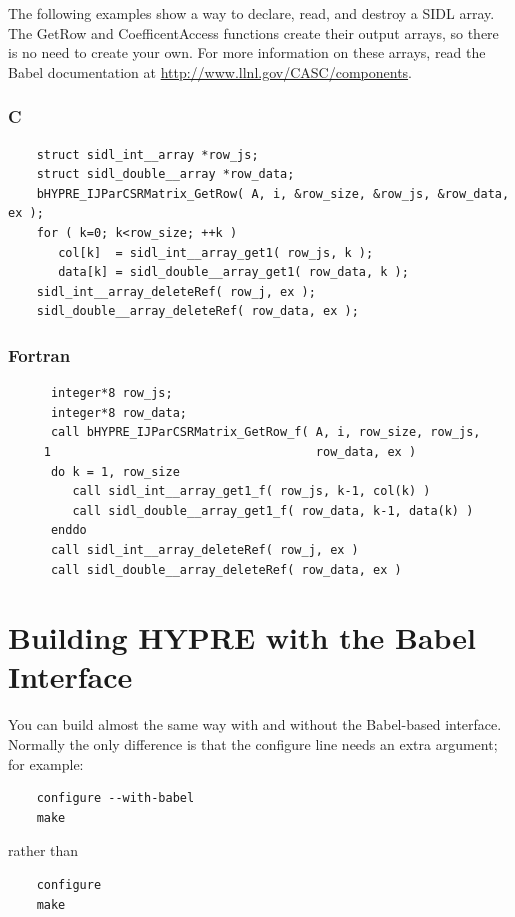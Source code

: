 The following examples show a way to declare, read, and destroy a SIDL
array.  The GetRow and CoefficentAccess functions create their output
arrays, so there is no need to create your own.  For more information
on these arrays, read the Babel documentation at
\url{http://www.llnl.gov/CASC/components}.


\subsubsection{C}
\begin{verbatim}
    struct sidl_int__array *row_js;
    struct sidl_double__array *row_data;
    bHYPRE_IJParCSRMatrix_GetRow( A, i, &row_size, &row_js, &row_data, ex );
    for ( k=0; k<row_size; ++k )
       col[k]  = sidl_int__array_get1( row_js, k );
       data[k] = sidl_double__array_get1( row_data, k );
    sidl_int__array_deleteRef( row_j, ex );
    sidl_double__array_deleteRef( row_data, ex );
\end{verbatim}
\subsubsection{Fortran}
\begin{verbatim}
      integer*8 row_js;
      integer*8 row_data;
      call bHYPRE_IJParCSRMatrix_GetRow_f( A, i, row_size, row_js,
     1                                     row_data, ex )
      do k = 1, row_size
         call sidl_int__array_get1_f( row_js, k-1, col(k) )
         call sidl_double__array_get1_f( row_data, k-1, data(k) )
      enddo
      call sidl_int__array_deleteRef( row_j, ex )
      call sidl_double__array_deleteRef( row_data, ex )
\end{verbatim}


\section{Building HYPRE with the Babel Interface}
\label{sec-Building-Babel}

You can build \hypre{} almost the same way with and without the
Babel-based interface.  Normally the only difference is that the
configure line needs an extra argument; for example:

\begin{verbatim}
    configure --with-babel
    make
\end{verbatim}
rather than
\begin{verbatim}
    configure
    make
\end{verbatim}

